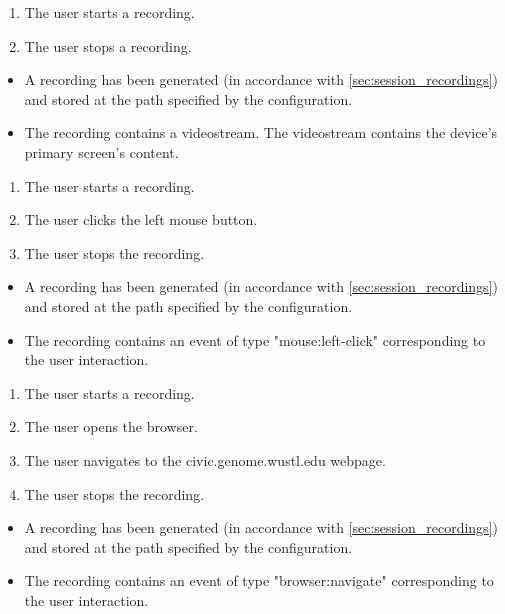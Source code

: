 \begin{tests}
    {\begin{enumerate}
        \item The \gls{user} starts a recording.
        \item The \gls{user} stops a recording.
    \end{enumerate}}
    {\begin{itemize}
        \item A recording has been generated (in accordance with \ref{sec:session_recordings}) and stored at the path specified by the configuration.
        \item The recording contains a videostream. The videostream contains the \gls{device}'s primary screen's content.
    \end{itemize}}

    {\begin{enumerate}
        \item The \gls{user} starts a recording.
        \item The \gls{user} clicks the left mouse button.
        \item The \gls{user} stops the recording.
    \end{enumerate}}
    {\begin{itemize}
        \item A recording has been generated (in accordance with \ref{sec:session_recordings}) and stored at the path specified by the configuration.
        \item The recording contains an \gls{event} of type "mouse:left-click" corresponding to the user interaction.
    \end{itemize}}

    {\begin{enumerate}
        \item The \gls{user} starts a recording.
        \item The \gls{user} opens the browser.
        \item The \gls{user} navigates to the civic.genome.wustl.edu webpage.
        \item The \gls{user} stops the recording.
    \end{enumerate}}
    {\begin{itemize}
        \item A recording has been generated (in accordance with \ref{sec:session_recordings}) and stored at the path specified by the configuration.
        \item The recording contains an \gls{event} of type "browser:navigate" corresponding to the user interaction.
    \end{itemize}}


\end{tests}
